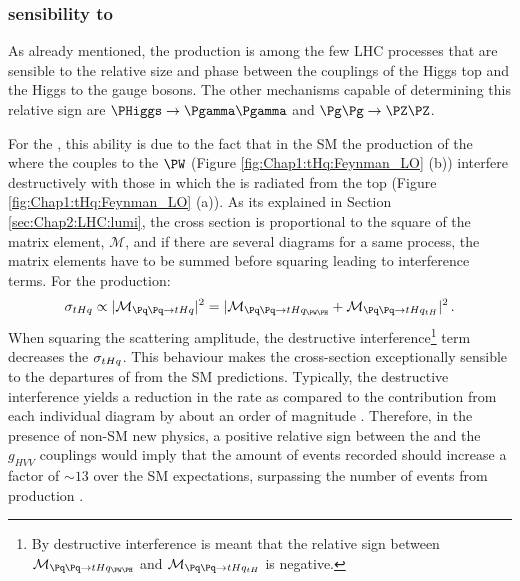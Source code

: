 \subsubsection{\tHq sensibility to \yt}
\label{sec:Chap1:tH:SensibilityToYukawa}
As already mentioned, the \tH production is among the few LHC processes that are 
sensible to the relative size and phase between
the couplings of the Higgs top and the Higgs to the gauge bosons. 
The other mechanisms capable of determining this relative sign 
are $\PHiggs \rightarrow \Pgamma \Pgamma$ and $\Pg \Pg \rightarrow \PZ \PZ$.

For the \tHq, this ability is due to the fact that in the SM the \tHq production of the where 
the \PHiggs couples to the $\PW$ (Figure \ref{fig:Chap1:tHq:Feynman_LO} (b)) interfere 
destructively with those in which the \PH is radiated from the top (Figure \ref{fig:Chap1:tHq:Feynman_LO} (a)). 
As its explained in Section \ref{sec:Chap2:LHC:lumi}, the cross section is 
proportional to the square of the matrix element, $\mathcal{M}$, and if there are several diagrams 
for a same process, the matrix elements have to be summed before squaring leading to interference terms. For the \tHq production:
\begin{equation}\label{eq:Chap1:sigmathqM}
	\sigma_{\tHq} \propto |\mathcal{M}_{\Pq \Pq \rightarrow \tHq}|^{2} = | \mathcal{M}_{\Pq \Pq \rightarrow \tHq_{\PW \PH}} + \mathcal{M}_{\Pq \Pq \rightarrow \tHq_{tH}} |^{2} \, .
\end{equation}
When squaring the scattering amplitude, the destructive interference\footnote{By destructive interference 
is meant that the relative sign between $\mathcal{M}_{\Pq \Pq \rightarrow \tHq_{\PW \PH}}$ and $\mathcal{M}_{\Pq \Pq \rightarrow \tHq_{tH}}$ 
is negative.} term decreases the $\sigma_{tHq}$. 
This behaviour makes the \tHq cross-section exceptionally sensible to the departures of \yt from the SM predictions. 
Typically, the destructive interference yields a reduction in the rate as compared to the
contribution from each individual diagram by about an order of magnitude \cite{Tait:2000sh}.
Therefore, in the presence of non-SM new physics, a positive relative sign between the \yt and the $g_{HVV}$ couplings would imply that the
amount of \tHq events recorded should increase a factor of $\sim 13$ over the SM expectations, surpassing the number of events from \ttH production \cite{Biswas:2013xva}.

